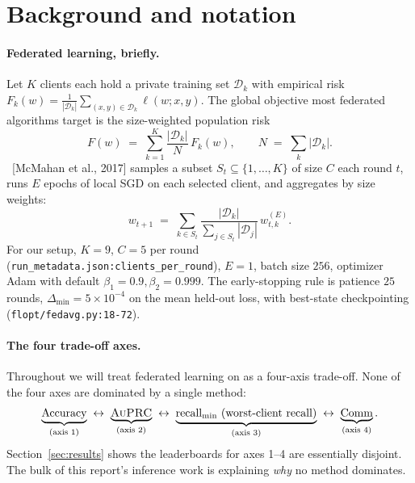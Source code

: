 \section{Background and notation}
\label{sec:background}

\paragraph{Federated learning, briefly.} Let $K$ clients each hold a private
training set $\mathcal{D}_k$ with empirical risk $F_k(w) = \frac{1}{|\mathcal{D}_k|}
\sum_{(x,y)\in\mathcal{D}_k} \ell(w; x, y)$. The global objective most federated
algorithms target is the size-weighted population risk
\[
F(w) \;=\; \sum_{k=1}^{K} \frac{|\mathcal{D}_k|}{N} \, F_k(w),
\qquad N \;=\; \sum_k |\mathcal{D}_k|.
\]
\fedavg{}~[McMahan et al., 2017] samples a subset $S_t \subseteq \{1,\dots,K\}$ of
size $C$ each round $t$, runs $E$ epochs of local SGD on each selected client,
and aggregates by size weights:
\[
w_{t+1} \;=\; \sum_{k \in S_t} \frac{|\mathcal{D}_k|}{\sum_{j\in S_t} |\mathcal{D}_j|}
            \, w_{t,k}^{(E)}.
\]
For our \mimic{} setup, $K = 9$, $C = 5$ per round
(\texttt{run\_metadata.json:clients\_per\_round}), $E = 1$, batch size $256$,
optimizer Adam with default $\beta_1 = 0.9, \beta_2 = 0.999$. The early-stopping
rule is patience $25$ rounds, $\Delta_{\min} = 5\!\times\!10^{-4}$ on the mean
held-out loss, with best-state checkpointing
(\texttt{flopt/fedavg.py:18-72}).

\paragraph{The four trade-off axes.} Throughout we will treat federated learning
on \mimic{} as a four-axis trade-off. None of the four axes are dominated by
a single method:
\[
\underbrace{\text{Accuracy}}_{(\text{axis 1})}
\;\leftrightarrow\;
\underbrace{\textsc{AuPRC}{}}_{(\text{axis 2})}
\;\leftrightarrow\;
\underbrace{\text{recall}_{\min}{} \text{ (worst-client recall)}}_{(\text{axis 3})}
\;\leftrightarrow\;
\underbrace{\text{Comm}}_{(\text{axis 4})}.
\]
Section~\ref{sec:results} shows the leaderboards for axes 1--4 are essentially
disjoint. The bulk of this report's inference work is explaining \emph{why} no
method dominates.

